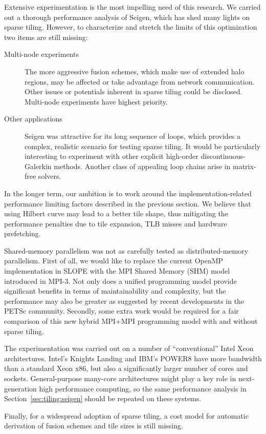 Extensive experimentation is the most impelling need of this research. We carried out a thorough performance analysis of Seigen, which has shed many lights on sparse tiling. However, to characterize and stretch the limits of this optimization two items are still missing:
\begin{description}
\item[Multi-node experiments] The more aggressive fusion schemes, which make use of extended halo regions, may be affected or take advantage from network communication. Other issues or potentials inherent in sparse tiling could be disclosed. Multi-node experiments have highest priority.
\item[Other applications] Seigen was attractive for its long sequence of loops, which provides a complex, realistic scenario for testing sparse tiling. It would be particularly interesting to experiment with other explicit high-order discontinuous-Galerkin methods. Another class of appealing loop chains arise in matrix-free solvers.
\end{description}

In the longer term, our ambition is to work around the implementation-related performance limiting factors described in the previous section. We believe that using Hilbert curve may lead to a better tile shape, thus mitigating the performance penalties due to tile expansion, TLB misses and hardware prefetching. 

Shared-memory parallelism was not as carefully tested as distributed-memory parallelism. First of all, we would like to replace the current OpenMP implementation in SLOPE with the MPI Shared Memory (SHM) model introduced in MPI-3. Not only does a unified programming model provide significant benefits in terms of maintainability and complexity, but the performance may also be greater as suggested by recent developments in the PETSc community. Secondly, some extra work would be required for a fair comparison of this new hybrid MPI+MPI programming model with and without sparse tiling.

The experimentation was carried out on a number of ``conventional'' Intel Xeon architectures. Intel's Knights Landing and IBM's POWER8 have more bandwidth than a standard Xeon x86, but also a significantly larger number of cores and sockets. General-purpose many-core architectures might play a key role in next-generation high performance computing, so the same performance analysis in Section~\ref{sec:tiling:seigen} should be repeated on these systems.

Finally, for a widespread adoption of sparse tiling, a cost model for automatic derivation of fusion schemes and tile sizes is still missing.


